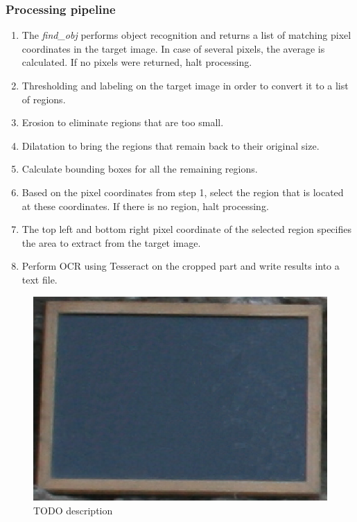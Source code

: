 \documentclass [12pt,a4paper]{report}
\begin{document}

\subsubsection{Processing pipeline} 

\begin{enumerate}
\item The \textit{find\_obj} performs object recognition and returns a list of matching pixel coordinates in the target image. In case of several pixels, the average is calculated. If no pixels were returned, halt processing.
\item Thresholding and labeling on the target image in order to convert it to a list of regions.
\item Erosion to eliminate regions that are too small.
\item Dilatation to bring the regions that remain back to their original size.
\item Calculate bounding boxes for all the remaining regions.
\item Based on the pixel coordinates from step 1, select the region that is located at these coordinates. If there is no region, halt processing.
\item The top left and bottom right pixel coordinate of the selected region specifies the area to extract from the target image.
\item Perform OCR using Tesseract on the cropped part and write results into a text file.
\end{enumerate}

\begin{center}
\begin{figure}[h]
\centering
\includegraphics[scale=0.3]{box.eps} %
\caption{TODO description}
\label{box}
\end{figure}
\end{center}
\end{document}
